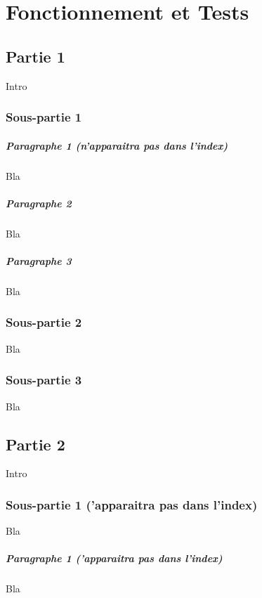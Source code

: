 \chapter{Fonctionnement et Tests}

\section{Partie 1}

Intro

\subsection{Sous-partie 1}

\paragraph*{Paragraphe 1 (n'apparaitra pas dans l'index)} Bla

\paragraph*{Paragraphe 2} Bla

\paragraph*{Paragraphe 3} Bla

\subsection{Sous-partie 2}

Bla

\subsection{Sous-partie 3}

Bla

\section{Partie 2}

Intro

\subsection*{Sous-partie 1 ('apparaitra pas dans l'index)} Bla

\paragraph*{Paragraphe 1 ('apparaitra pas dans l'index)} Bla

